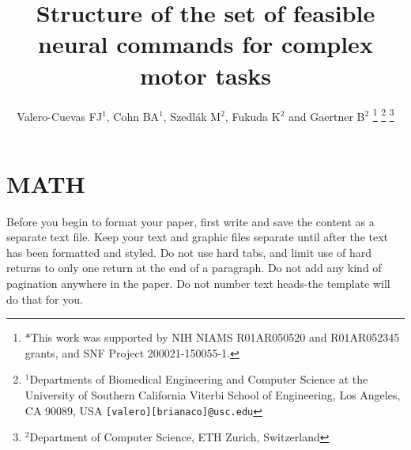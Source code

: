 \documentclass[letterpaper, 10 pt, conference]{ieeeconf}  %
\title{\LARGE \bf
Structure of the set of feasible neural commands for complex motor tasks
}
\author{Valero-Cuevas FJ$^{1}$, Cohn BA$^{1}$, Szedl\'{a}k M$^{2}$, Fukuda K$^{2}$ and  Gaertner B$^{2}$%
\thanks{*This work was supported by NIH NIAMS R01AR050520 and R01AR052345 grants, and SNF Project 200021-150055-1.
}%
\thanks{$^{1}$Departments of Biomedical Engineering and Computer Science at the University of Southern California Viterbi School of Engineering, Los Angeles, CA 90089, USA
        {\tt\small [valero][brianaco]@usc.edu}}%
\thanks{$^{2}$Department of Computer Science, ETH Zurich, Switzerland}%
}
\begin{document}
\maketitle
\thispagestyle{empty}
\pagestyle{empty}









\section{MATH}

Before you begin to format your paper, first write and save the content as a separate text file. Keep your text and graphic files separate until after the text has been formatted and styled. Do not use hard tabs, and limit use of hard returns to only one return at the end of a paragraph. Do not add any kind of pagination anywhere in the paper. Do not number text heads-the template will do that for you.







  

\addtolength{\textheight}{-12cm}   %













\end{document}
